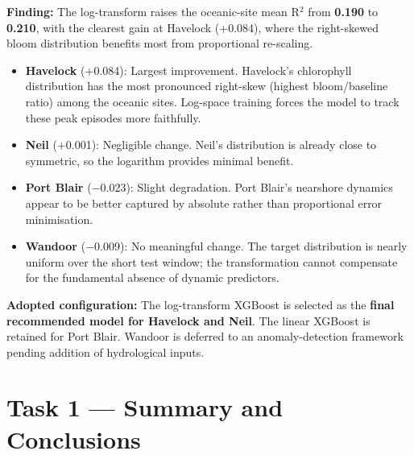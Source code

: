 \documentclass[12pt,a4paper]{report}
\begin{document}
\begin{findingbox}
\textbf{Finding:} The log-transform raises the oceanic-site mean R$^2$ from \textbf{0.190}
to \textbf{0.210}, with the clearest gain at Havelock ($+$0.084), where the
right-skewed bloom distribution benefits most from proportional re-scaling.

\begin{itemize}[leftmargin=*, nosep]
  \item \textbf{Havelock} ($+$0.084): Largest improvement. Havelock's chlorophyll
  distribution has the most pronounced right-skew (highest bloom/baseline ratio)
  among the oceanic sites. Log-space training forces the model to track these peak
  episodes more faithfully.
  \item \textbf{Neil} ($+$0.001): Negligible change. Neil's distribution is already
  close to symmetric, so the logarithm provides minimal benefit.
  \item \textbf{Port Blair} ($-$0.023): Slight degradation. Port Blair's nearshore
  dynamics appear to be better captured by absolute rather than proportional
  error minimisation.
  \item \textbf{Wandoor} ($-$0.009): No meaningful change. The target distribution is
  nearly uniform over the short test window; the transformation cannot compensate
  for the fundamental absence of dynamic predictors.
\end{itemize}

\textbf{Adopted configuration:} The log-transform XGBoost is selected as the
\textbf{final recommended model for Havelock and Neil}. The linear XGBoost is
retained for Port Blair. Wandoor is deferred to an anomaly-detection framework
pending addition of hydrological inputs.
\end{findingbox}

\section{Task 1 --- Summary and Conclusions}
\label{sec:task1_summary}
\end{document}
